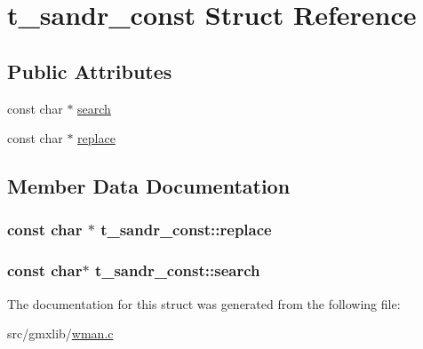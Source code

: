 \hypertarget{structt__sandr__const}{\section{t\-\_\-sandr\-\_\-const \-Struct \-Reference}
\label{structt__sandr__const}
}
\subsection*{\-Public \-Attributes}
\begin{DoxyCompactItemize}
\item 
const char $\ast$ \hyperlink{structt__sandr__const_a7dd8670d7ed1d70262dd9eed9c3bb722}{search}
\item 
const char $\ast$ \hyperlink{structt__sandr__const_a5934682a6f25ae52dd40696930c3a659}{replace}
\end{DoxyCompactItemize}


\subsection{\-Member \-Data \-Documentation}
\hypertarget{structt__sandr__const_a5934682a6f25ae52dd40696930c3a659}{
\subsubsection[{replace}]{\setlength{\rightskip}{0pt plus 5cm}const char $\ast$ {\bf t\-\_\-sandr\-\_\-const\-::replace}}}\label{structt__sandr__const_a5934682a6f25ae52dd40696930c3a659}
\hypertarget{structt__sandr__const_a7dd8670d7ed1d70262dd9eed9c3bb722}{
\subsubsection[{search}]{\setlength{\rightskip}{0pt plus 5cm}const char$\ast$ {\bf t\-\_\-sandr\-\_\-const\-::search}}}\label{structt__sandr__const_a7dd8670d7ed1d70262dd9eed9c3bb722}


\-The documentation for this struct was generated from the following file\-:\begin{DoxyCompactItemize}
\item 
src/gmxlib/\hyperlink{wman_8c}{wman.\-c}\end{DoxyCompactItemize}
